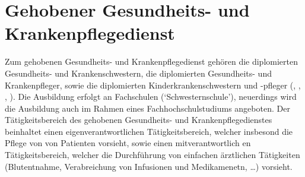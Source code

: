 \section{Gehobener Gesundheits- und Krankenpflegedienst}

Zum gehobenen Gesundheits- und Krankenpflegedienst gehören
die diplomierten Gesundheits- und Krankenschwestern, die
diplomierten Gesundheits- und Krankenpfleger, sowie die
diplomierten Kinderkrankenschwestern und -pfleger (,
, , ). 
Die Ausbildung erfolgt
an Fachschulen (\enquote*{Schwesternschule}), neuerdings
wird die Ausbildung auch im Rahmen eines Fachhochschulstudiums angeboten. 
Der Tätigkeitsbereich des gehobenen Gesundheits- und
Krankenpflegedienstes beinhaltet einen
eigenverantwortlichen 
Tätigkeitsbereich, welcher insbesond die Pflege von
von Patienten vorsieht, sowie einen mitverantwortlich en
Tätigkeitsbereich, welcher die Durchführung von einfachen
ärztlichen Tätigkeiten (Blutentnahme, Verabreichung von
Infusionen und Medikamenetn, \ldots) vorsieht.



\ChapterEnd

